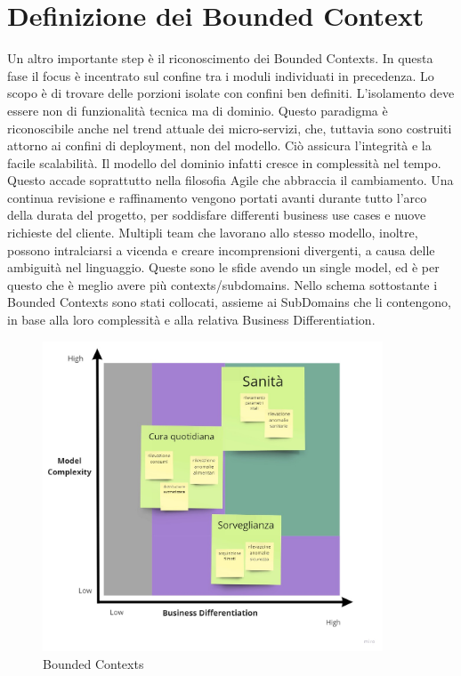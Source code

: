     \section{Definizione dei Bounded Context}
    Un altro importante step è il riconoscimento dei Bounded Contexts. In questa fase il focus è incentrato sul confine tra i moduli individuati in precedenza. Lo scopo è di trovare delle porzioni isolate con confini ben definiti. L’isolamento deve essere non di funzionalità tecnica ma di dominio. Questo paradigma è riconoscibile anche nel trend attuale dei micro-servizi, che, tuttavia sono costruiti attorno ai confini di deployment, non del modello. Ciò assicura l’integrità e la facile scalabilità.
    Il modello del dominio infatti cresce in complessità nel tempo. Questo accade soprattutto nella filosofia Agile che abbraccia il cambiamento. Una continua revisione e raffinamento vengono portati avanti durante tutto l'arco della durata del progetto, per soddisfare differenti business use cases e nuove richieste del cliente. 
    Multipli team che lavorano allo stesso modello, inoltre, possono intralciarsi a vicenda e creare incomprensioni divergenti, a causa delle ambiguità nel linguaggio. 
    Queste sono le sfide avendo un single model, ed è per questo che è meglio avere più contexts/subdomains.
    Nello schema sottostante i Bounded Contexts sono stati collocati, assieme ai SubDomains che li contengono, in base alla loro complessità e alla relativa Business Differentiation. 
    
    \begin{figure}[ht]
        \caption{Bounded Contexts}
        \centering
        \includegraphics[width=0.9\textwidth]{Miro/BoundedContext.jpg}
    \end{figure}
    
